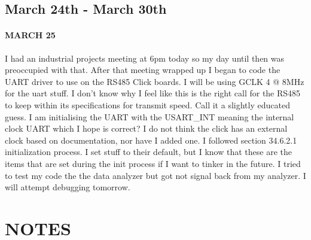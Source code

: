 \documentclass{article}
\begin{document}
\subsection{March 24th - March 30th}
\paragraph{MARCH 25} I had an industrial projects meeting at 6pm today so my day until then was preoccupied with that. After that meeting wrapped up I began to code the UART driver to use on the RS485 Click boards. I will be using GCLK 4 @ 8MHz for the uart stuff. I don't know why I feel like this is the right call for the RS485 to keep within its specifications for transmit speed. Call it a slightly educated guess. I am initialising the UART with the USART\_INT meaning the internal clock UART which I hope is correct? I do not think the click has an external clock based on documentation, nor have I added one. I followed section 34.6.2.1 initialization process. I set stuff to their default, but I know that these are the items that are set during the init process if I want to tinker in the future. I tried to test my code the the data analyzer but got not signal back from my analyzer. I will attempt debugging tomorrow.
\section{NOTES}



\end{document}
